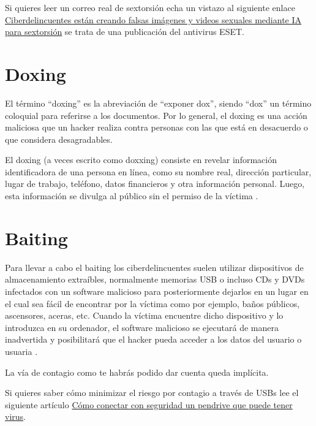\documentclass[
  a4paper,
  openany]{book}
\begin{document}
Si quieres leer un correo real de sextorsión echa un vistazo al siguiente enlace \href{https://www.welivesecurity.com/la-es/2023/06/09/ciberdelincuentes-falsas-imagenes-videos-sexuales-mediante-inteligencia-artificial-sextorsion/}{Ciberdelincuentes están creando falsas imágenes y videos sexuales mediante IA para sextorsión} se trata de una publicación del antivirus ESET.

\hypertarget{doxing}{%
\section{Doxing}\label{doxing}}

El término ``doxing'' es la abreviación de ``exponer dox'', siendo ``dox'' un término coloquial para referirse a los documentos. Por lo general, el doxing es una acción maliciosa que un hacker realiza contra personas con las que está en desacuerdo o que considera desagradables.

El doxing (a veces escrito como doxxing) consiste en revelar información identificadora de una persona en línea, como su nombre real, dirección particular, lugar de trabajo, teléfono, datos financieros y otra información personal. Luego, esta información se divulga al público sin el permiso de la víctima \citep{KASPER-doxing}.

\hypertarget{baiting}{%
\section{Baiting}\label{baiting}}

Para llevar a cabo el baiting los ciberdelincuentes suelen utilizar dispositivos de almacenamiento extraíbles, normalmente memorias USB o incluso CDs y DVDs infectados con un software malicioso para posteriormente dejarlos en un lugar en el cual sea fácil de encontrar por la víctima como por ejemplo, baños públicos, ascensores, aceras, etc. Cuando la víctima encuentre dicho dispositivo y lo introduzca en su ordenador, el software malicioso se ejecutará de manera inadvertida y posibilitará que el hacker pueda acceder a los datos del usuario o usuaria \citep{baiting}.

La vía de contagio como te habrás podido dar cuenta queda implícita.

Si quieres saber cómo minimizar el riesgo por contagio a través de USBs lee el siguiente artículo \href{https://www.redeszone.net/tutoriales/seguridad/que-hacer-pendrive-virus/}{Cómo conectar con seguridad un pendrive que puede tener virus}.
\end{document}
